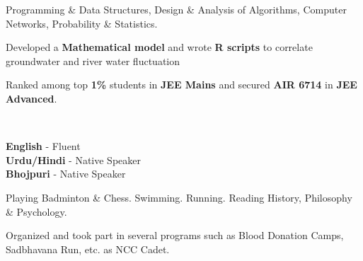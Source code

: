 \documentclass[8pt]{developercv} %
\begin{document}
\begin{minipage}[t]{0.3\textwidth}
	\vspace{-\baselineskip} %

	
	Programming \& Data Structures, Design \& Analysis of Algorithms, Computer Networks, Probability \& Statistics.
\end{minipage}
\hfill
\begin{minipage}[t]{0.3\textwidth}
	\vspace{-\baselineskip} %
	
	
	Developed a \textbf{Mathematical model} and wrote \textbf{R scripts} to correlate groundwater and river water fluctuation
\end{minipage}
\hfill
\begin{minipage}[t]{0.3\textwidth}
	\vspace{-\baselineskip} %
	
	
	Ranked among top \textbf{1\%} students in \textbf{JEE Mains} and secured \textbf{AIR 6714} in \textbf{JEE Advanced}.
\end{minipage}
\\

\begin{minipage}[t]{0.3\textwidth}
	\vspace{-\baselineskip} %

	
	\textbf{English} - Fluent\\
	\textbf{Urdu/Hindi} - Native Speaker\\
	\textbf{Bhojpuri} - Native Speaker
\end{minipage}
\hfill
\begin{minipage}[t]{0.3\textwidth}
	\vspace{-\baselineskip} %
	
	
	Playing Badminton \& Chess.	Swimming. Running. Reading History, Philosophy \& Psychology.
\end{minipage}
\hfill
\begin{minipage}[t]{0.3\textwidth}
	\vspace{-\baselineskip} %
	
	
	Organized and took part in several programs such as Blood Donation Camps, Sadbhavana Run, etc. as NCC Cadet.
\end{minipage}

\end{document}
